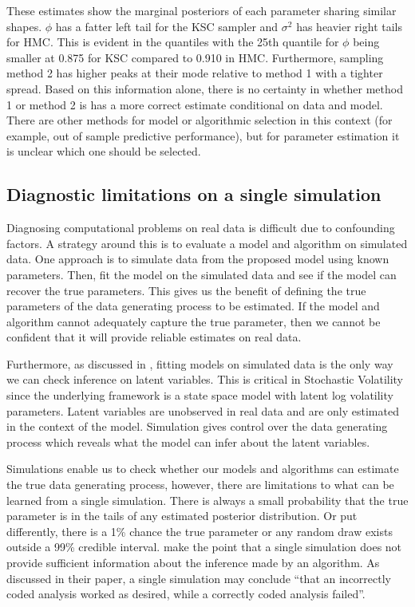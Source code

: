 \documentclass[12pt, a4paper]{article}
\begin{document}
    These estimates show the marginal posteriors of each parameter sharing similar shapes. $\phi$  has a fatter left tail for the KSC sampler and $\sigma^2$ has heavier right tails for HMC. This is evident in the quantiles with the 25th quantile for $\phi$ being smaller at 0.875 for KSC compared to 0.910 in HMC. Furthermore, sampling method 2 has higher peaks at their mode relative to method 1 with a tighter spread. Based on this information alone, there is no certainty in whether method 1 or method 2 is has a more correct estimate conditional on data and model. There are other methods for model or algorithmic selection in this context (for example, out of sample predictive performance), but for parameter estimation it is unclear which one should be selected. 

\subsection{Diagnostic limitations on a single simulation}
    Diagnosing computational problems on real data is difficult due to confounding factors. A strategy around this is to evaluate a model and algorithm on simulated data. One approach is to simulate data from the proposed model using known parameters. Then, fit the model on the simulated data and see if the model can recover the true parameters. This gives us the benefit of defining the true parameters of the data generating process to be estimated. If the model and algorithm cannot adequately capture the true parameter, then we cannot be confident that it will provide reliable estimates on real data.

    Furthermore, as discussed in \citet{gelman2020bayesian}, fitting models on simulated data is the only way we can check inference on latent variables. This is critical in Stochastic Volatility since the underlying framework is a state space model with latent log volatility parameters. Latent variables are unobserved in real data and are only estimated in the context of the model. Simulation gives control over the data generating process which reveals what the model can infer about the latent variables. 

    Simulations enable us to check whether our models and algorithms can estimate the true data generating process, however, there are limitations to what can be learned from a single simulation. There is always a small probability that the true parameter is in the tails of any estimated posterior distribution. Or put differently, there is a 1\% chance the true parameter or any random draw exists outside a 99\% credible interval. \cite{talts2018validating} make the point that a single simulation does not provide sufficient information about the inference made by an algorithm. As discussed in their paper, a single simulation may conclude ``that an incorrectly coded analysis worked as desired, while a correctly coded analysis failed''. 
\end{document}
